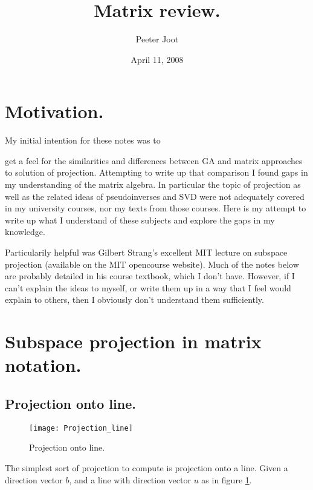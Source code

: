 \documentclass{article}      %
\title{ Matrix review. } %
\author{Peeter Joot}         %
\date{ April 11, 2008 }        %
\begin{document}

\maketitle{}


\section{ Motivation. }


My initial intention for these notes was to 

get a feel for the similarities and differences between GA and matrix approaches to solution of projection.  Attempting to
write up that comparison
I found gaps in my understanding of the matrix algebra.  In particular the topic of projection as well as the related
ideas of pseudoinverses and SVD were not adequately covered in my university courses, nor my texts from those courses.
Here is my attempt to write up what I understand of these subjects and explore the gaps in my knowledge.

Particularily helpful was 
Gilbert Strang's excellent MIT lecture on subspace projection (available on the MIT opencourse website).
Much of the notes below are probably detailed in his course textbook, which I don't have.  However, 
if I can't explain the ideas to myself, or write them up in a way that I feel would explain
to others, then I obviously don't understand them sufficiently.


\section{ Subspace projection in matrix notation. }


\subsection{ Projection onto line. }


\begin{figure}[htp]

\centering
\texttt{[image: Projection\_line]}
\caption{Projection onto line.}\label{fig:Projection_line}
\end{figure}

The simplest sort of projection to compute is projection onto a line.  Given a direction vector $b$, and a line with direction vector $u$
as in figure \ref{fig:Projection_line}.
\end{document}
